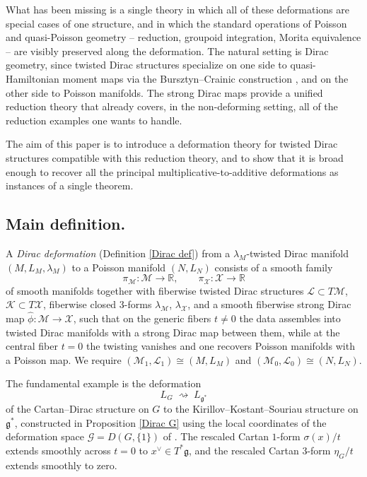 \documentclass[reqno]{amsart}
\theoremstyle{plain}
\theoremstyle{definition}
\begin{document}
 
What has been missing is a single theory in which all of these deformations are special cases of one structure, and in which the standard operations of Poisson and quasi-Poisson
geometry -- reduction, groupoid integration, Morita equivalence -- are visibly preserved along the deformation. The natural setting is Dirac geometry, since twisted Dirac structures
specialize on one side to quasi-Hamiltonian moment maps via the Bursztyn--Crainic
construction \cite{bursztyn2005dirac,bursztyn2007dirac}, and on the other side to
Poisson manifolds. The strong Dirac maps \cite{bursztyn2005dirac,bualibanu2026reduction}
provide a unified reduction theory that already covers, in the non-deforming setting, all of the reduction examples one wants to handle.
 
The aim of this paper is to introduce a deformation theory for twisted Dirac structures compatible with this reduction theory, and to show that it is broad enough to recover all the principal multiplicative-to-additive deformations as instances of a single theorem.
 
\subsection*{Main definition.}
A \emph{Dirac deformation} (Definition \ref{Dirac def}) from a $\lambda_M$-twisted
Dirac manifold $(M,L_M,\lambda_M)$ to a Poisson manifold $(N,L_N)$ consists of a smooth
family
\[
\pi_{\mathcal{M}}\colon \mathcal{M}\longrightarrow\mathbb{R},\qquad
\pi_{\mathcal{X}}\colon \mathcal{X}\longrightarrow\mathbb{R}
\]
of smooth manifolds together with fiberwise twisted Dirac structures $\mathcal{L}\subset T\mathcal{M}$,
$\mathcal{K}\subset T\mathcal{X}$, fiberwise closed $3$-forms $\lambda_{\mathcal{M}}$, $\lambda_{\mathcal{X}}$,
and a smooth fiberwise strong Dirac map $\widehat{\phi}\colon\mathcal{M}\to\mathcal{X}$,
such that on the generic fibers $t\neq 0$ the data assembles into twisted Dirac manifolds
with a strong Dirac map between them, while at the central fiber $t=0$ the twisting vanishes
and one recovers Poisson manifolds with a Poisson map. We require $(\mathcal{M}_1,\mathcal{L}_1)\cong(M,L_M)$
and $(\mathcal{M}_0,\mathcal{L}_0)\cong(N,L_N)$.
 
The fundamental example is the deformation
\[
L_G \;\rightsquigarrow\; L_{\mathfrak{g}^*}
\]
of the Cartan--Dirac structure on $G$ to the Kirillov--Kostant--Souriau structure on $\mathfrak{g}^*$,
constructed in Proposition \ref{Dirac G} using the local coordinates of the deformation space $\mathcal{G}=D(G,\{1\})$ of \cite{burelle2026deformations}. The rescaled
Cartan $1$-form $\sigma(x)/t$ extends smoothly across $t=0$ to $x^\vee\in T^*\mathfrak{g}$,
and the rescaled Cartan $3$-form $\eta_G/t$ extends smoothly to zero. 
 
\end{document}
